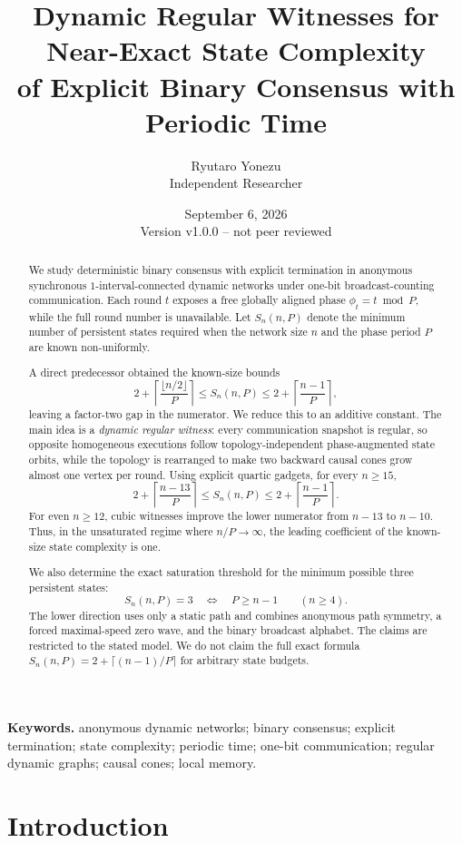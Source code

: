 \documentclass[11pt]{article}
\title{\textbf{Dynamic Regular Witnesses for Near-Exact State Complexity\\
of Explicit Binary Consensus with Periodic Time}}
\author{Ryutaro Yonezu\\\small Independent Researcher}
\date{September 6, 2026\\\small Version v1.0.0 -- not peer reviewed}
\theoremstyle{remark}
\begin{document}
\maketitle

\begin{abstract}
We study deterministic binary consensus with explicit termination in anonymous synchronous
$1$-interval-connected dynamic networks under one-bit broadcast-counting communication.
Each round $t$ exposes a free globally aligned phase $\phi_t=t\bmod P$, while the full
round number is unavailable.  Let $S_n(n,P)$ denote the minimum number of persistent
states required when the network size $n$ and the phase period $P$ are known
non-uniformly.

A direct predecessor obtained the known-size bounds
\[
2+\left\lceil\frac{\lfloor n/2\rfloor}{P}\right\rceil
\le S_n(n,P)\le
2+\left\lceil\frac{n-1}{P}\right\rceil,
\]
leaving a factor-two gap in the numerator.  We reduce this to an additive constant.
The main idea is a \emph{dynamic regular witness}: every communication snapshot is
regular, so opposite homogeneous executions follow topology-independent phase-augmented
state orbits, while the topology is rearranged to make two backward causal cones grow
almost one vertex per round.  Using explicit quartic gadgets, for every $n\ge15$,
\[
\boxed{
2+\left\lceil\frac{n-13}{P}\right\rceil
\le S_n(n,P)\le
2+\left\lceil\frac{n-1}{P}\right\rceil.
}
\]
For even $n\ge12$, cubic witnesses improve the lower numerator from $n-13$ to $n-10$.
Thus, in the unsaturated regime where $n/P\to\infty$, the leading coefficient of the known-size state complexity is one.

We also determine the exact saturation threshold for the minimum possible three
persistent states:
\[
\boxed{
S_n(n,P)=3\quad\Longleftrightarrow\quad P\ge n-1
}
\qquad(n\ge4).
\]
The lower direction uses only a static path and combines anonymous path symmetry,
a forced maximal-speed zero wave, and the binary broadcast alphabet.
The claims are restricted to the stated model.  We do not claim the full exact formula
$S_n(n,P)=2+\lceil(n-1)/P\rceil$ for arbitrary state budgets.
\end{abstract}

\noindent\textbf{Keywords.}
anonymous dynamic networks; binary consensus; explicit termination; state complexity;
periodic time; one-bit communication; regular dynamic graphs; causal cones; local memory.

\section{Introduction}
\end{document}
